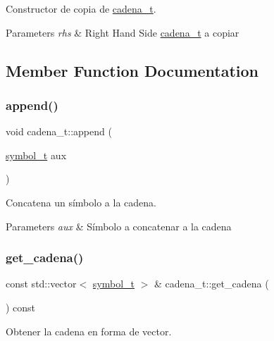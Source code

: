Constructor de copia de \hyperlink{classcadena__t}{cadena\+\_\+t}. 


\begin{DoxyParams}{Parameters}
{\em rhs} & Right Hand Side \hyperlink{classcadena__t}{cadena\+\_\+t} a copiar \\
\hline
\end{DoxyParams}


\subsection{Member Function Documentation}
\mbox{\label{classcadena__t_a71622adf07f846ab794250ea49914c9a}} 
\subsubsection{\texorpdfstring{append()}{append()}}
{\footnotesize\ttfamily void cadena\+\_\+t\+::append (\begin{DoxyParamCaption}\item[{\hyperlink{classsymbol__t}{symbol\+\_\+t}}]{aux }\end{DoxyParamCaption})}



Concatena un símbolo a la cadena. 


\begin{DoxyParams}{Parameters}
{\em aux} & Símbolo a concatenar a la cadena \\
\hline
\end{DoxyParams}
\mbox{\label{classcadena__t_a31b03c4d2759474af12ce90c51ba6396}} 
\subsubsection{\texorpdfstring{get\+\_\+cadena()}{get\_cadena()}}
{\footnotesize\ttfamily const std\+::vector$<$ \hyperlink{classsymbol__t}{symbol\+\_\+t} $>$ \& cadena\+\_\+t\+::get\+\_\+cadena (\begin{DoxyParamCaption}{ }\end{DoxyParamCaption}) const}



Obtener la cadena en forma de vector. 

